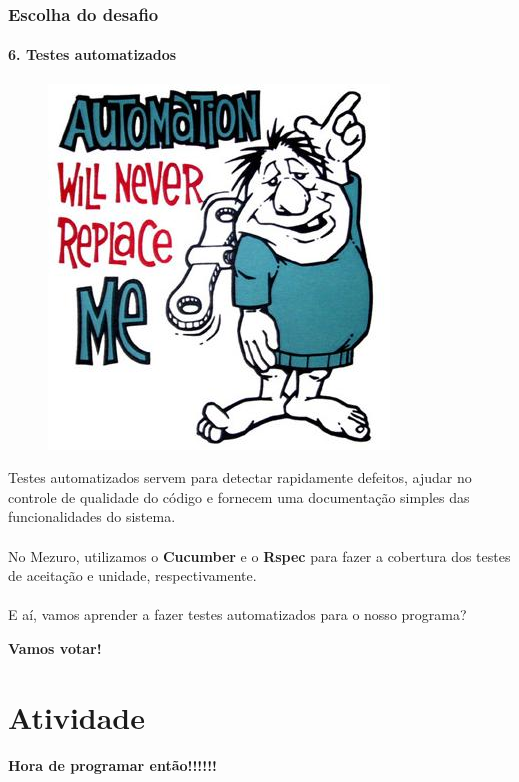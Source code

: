 \documentclass{beamer}
\begin{document}
\begin{frame}
	\frametitle{Escolha do desafio}
  \framesubtitle{6. Testes automatizados}

  \begin{figure}[htb]
    \begin{center}
      \includegraphics[scale=0.2]{automation.jpg}
    \end{center}
  \end{figure}
  
  Testes automatizados servem para detectar  rapidamente  defeitos,  ajudar  no  controle de  qualidade  do  código  e  fornecem   uma  documentação  simples  das  funcionalidades  do sistema. \\~\\
  No Mezuro, utilizamos o \textbf{Cucumber} e o \textbf{Rspec} para fazer a cobertura dos testes de aceitação e unidade, respectivamente. \\~\\
  
  E aí, vamos aprender a fazer testes automatizados para o nosso programa?

\end{frame}

\begin{frame}
  \LARGE{\textbf{Vamos votar!}}
\end{frame}

\section{Atividade}
\begin{frame}
  \LARGE{\textbf{Hora de programar então!!!!!!}}
\end{frame}
\end{document}
